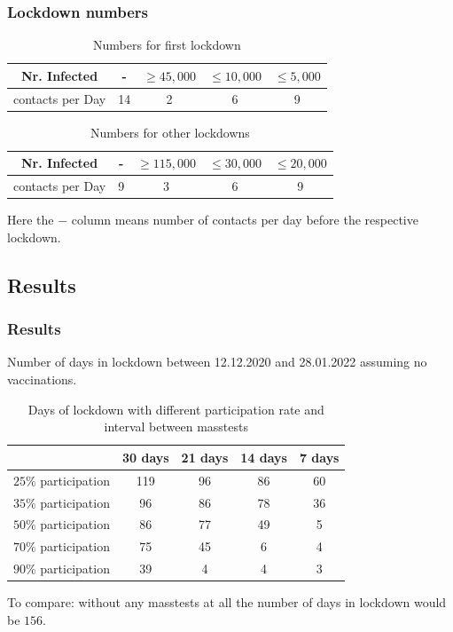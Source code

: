 \documentclass{beamer}
\begin{document}
\begin{frame}
  \frametitle{Lockdown numbers}

  \begin{table}[!h]
  \begin{center}
  \begin{tabular}{|c||c|c|c|c|}
  \hline
    Nr. Infected &- & $\geq 45,000$ & $\leq 10,000$ & $\leq 5,000$ \\
    \hline
    contacts per Day & 14 & 2 & 6 & 9 \\
    \hline
  \end{tabular}
  \end{center}
  \caption{Numbers for first lockdown}
  \end{table}

  \begin{table}[!h]
  \begin{center}
  \begin{tabular}{|c||c|c|c|c|}
  \hline
    Nr. Infected &- & $\geq 115,000$ & $\leq 30,000$ & $\leq 20,000$ \\
    \hline
    contacts per Day & 9 & 3 & 6 & 9 \\
    \hline
  \end{tabular}
  \end{center}
  \caption{Numbers for other lockdowns}
  \end{table}

  Here the $-$ column means number of contacts per day before the respective lockdown.
\end{frame}

\subsection{Results}

\begin{frame}
\frametitle{Results}

Number of days in lockdown between 12.12.2020 and 28.01.2022 assuming no vaccinations.
\begin{table}[!h]
{\small%
\begin{center}
\begin{tabular}{|c||c|c|c|c|}
 \hline
 & 30 days    & 21 days   & 14 days  & 7 days  \\
  \hline
  \hline
      $25\%$ participation & 119 &96 & 86 & 60\\
  \hline
      $35\%$ participation    & 96 &  86&  78  & 36   \\
  \hline
      $50\%$ participation & 86 & 77 & 49 & 5\\
  \hline
      $70\%$ participation & 75 &  45 & 6 & 4 \\
  \hline
      $90\%$ participation & 39 &4 &4  & 3\\
      \hline
\end{tabular}
\end{center}
}%

\caption{Days of lockdown with different participation rate and interval between masstests}
\end{table}
To compare: without any masstests at all the number of days in lockdown would be $156$.
\end{frame}
\end{document}
